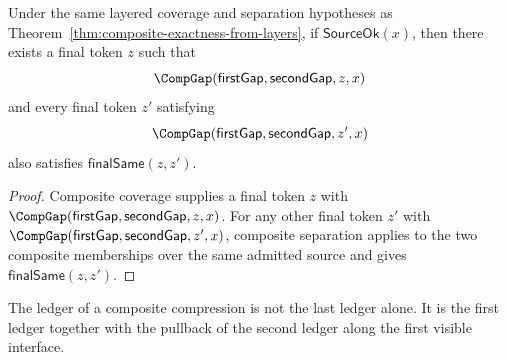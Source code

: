\begin{theorem}
\label{thm:composite-representative-for-admitted-source}
Under the same layered coverage and separation hypotheses as Theorem~\ref{thm:composite-exactness-from-layers}, if $\mathsf{SourceOk}(x)$, then there exists a final token $z$ such that
$$
\CompGap(\mathsf{firstGap},\mathsf{secondGap},z,x)
$$
and every final token $z'$ satisfying
$$
\CompGap(\mathsf{firstGap},\mathsf{secondGap},z',x)
$$
also satisfies $\mathsf{finalSame}(z,z')$.
\end{theorem}
\begin{proof}
Composite coverage supplies a final token $z$ with $\CompGap(\mathsf{firstGap},\mathsf{secondGap},z,x)$. For any other final token $z'$ with $\CompGap(\mathsf{firstGap},\mathsf{secondGap},z',x)$, composite separation applies to the two composite memberships over the same admitted source and gives $\mathsf{finalSame}(z,z')$.
\end{proof}

\begin{principle}
\label{cor:ledger-composition-principle}
The ledger of a composite compression is not the last ledger alone. It is the first ledger together with the pullback of the second ledger along the first visible interface.
\end{principle}

